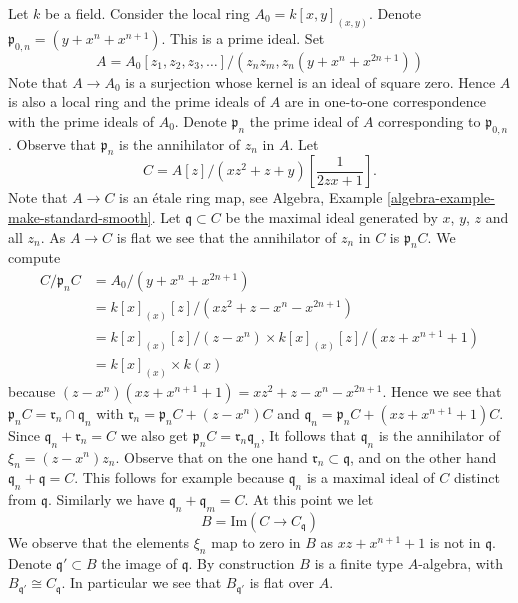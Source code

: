 \noindent
Let $k$ be a field. Consider the local ring $A_0 = k[x, y]_{(x, y)}$.
Denote $\mathfrak p_{0, n} = (y + x^n + x^{n + 1})$. This is a prime ideal.
Set
$$
A = A_0[z_1, z_2, z_3, \ldots]/(z_n z_m, z_n(y + x^n + x^{2n + 1}))
$$
Note that $A \to A_0$ is a surjection whose kernel is an ideal of
square zero. Hence $A$ is also a local ring and the prime ideals of $A$
are in one-to-one correspondence with the prime ideals of $A_0$.
Denote $\mathfrak p_n$ the prime ideal of $A$ corresponding to
$\mathfrak p_{0, n}$. Observe that $\mathfrak p_n$ is the annihilator
of $z_n$ in $A$. Let
$$
C = A[z]/(xz^2 + z + y)[\frac{1}{2zx + 1}].
$$
Note that $A \to C$ is an \'etale ring map, see
Algebra, Example \ref{algebra-example-make-standard-smooth}.
Let $\mathfrak q \subset C$ be the maximal ideal generated by
$x$, $y$, $z$ and all $z_n$. As $A \to C$ is flat we see that the
annihilator of $z_n$ in $C$ is $\mathfrak p_nC$. We compute
\begin{align*}
C/\mathfrak p_n C
& =
A_0/(y + x^n + x^{2n + 1}) \\
& =
k[x]_{(x)}[z]/(xz^2 + z - x^n - x^{2n + 1}) \\
& =
k[x]_{(x)}[z]/(z - x^n) \times k[x]_{(x)}[z]/(xz + x^{n + 1} + 1) \\
& =
k[x]_{(x)} \times k(x)
\end{align*}
because $(z - x^n)(xz + x^{n + 1} + 1) = xz^2 + z - x^n - x^{2n + 1}$.
Hence we see that $\mathfrak p_nC = \mathfrak r_n \cap \mathfrak q_n$
with $\mathfrak r_n = \mathfrak p_nC + (z - x^n)C$ and
$\mathfrak q_n = \mathfrak p_nC + (xz + x^{n + 1} + 1)C$.
Since $\mathfrak q_n + \mathfrak r_n = C$ we also get
$\mathfrak p_nC = \mathfrak r_n \mathfrak q_n$,
It follows that $\mathfrak q_n$ is the annihilator of $\xi_n = (z - x^n)z_n$.
Observe that on the one hand $\mathfrak r_n \subset \mathfrak q$, and
on the other hand $\mathfrak q_n + \mathfrak q = C$. This follows for example
because $\mathfrak q_n$ is a maximal ideal of $C$ distinct from $\mathfrak q$.
Similarly we have $\mathfrak q_n + \mathfrak q_m = C$.
At this point we let
$$
B = \text{Im}(C \longrightarrow C_{\mathfrak q})
$$
We observe that the elements $\xi_n$ map to zero in $B$ as $xz + x^{n + 1} + 1$
is not in $\mathfrak q$. Denote $\mathfrak q' \subset B$ the image of
$\mathfrak q$. By construction $B$ is a finite type $A$-algebra, with
$B_{\mathfrak q'} \cong C_{\mathfrak q}$. In particular we see that
$B_{\mathfrak q'}$ is flat over $A$.

